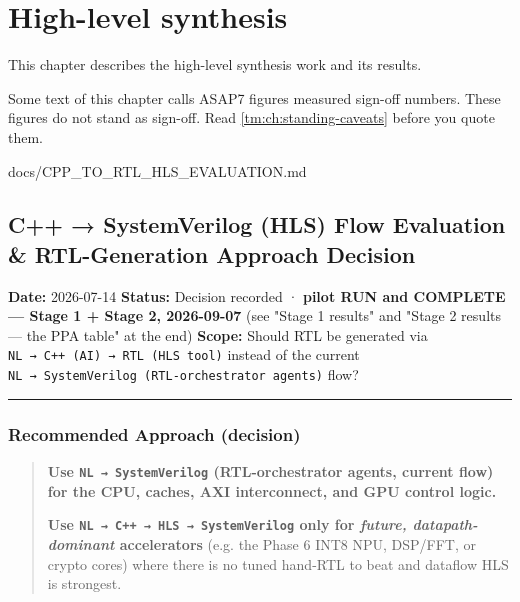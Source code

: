\chapter{High-level synthesis}\label{tm:ch:high-level-synthesis}

This chapter describes the high-level synthesis work and its results.

\begin{information}
Some text of this chapter calls ASAP7 figures measured sign-off numbers. These figures do not stand as sign-off. Read \cref{tm:ch:standing-caveats} before you quote them.
\end{information}

\begin{relocated}{docs/CPP_TO_RTL_HLS_EVALUATION.md}
\section{C++ → SystemVerilog (HLS) Flow Evaluation \& RTL-Generation
Approach Decision}\label{tm:dec:cpp-to-rtl-hls-evaluation}

\textbf{Date:} 2026-07-14 \textbf{Status:} Decision recorded ·
\textbf{pilot RUN and COMPLETE --- Stage 1 + Stage 2, 2026-09-07} (see
"Stage 1 results" and "Stage 2 results --- the PPA table" at the end)
\textbf{Scope:} Should RTL be generated via
\texttt{NL\ →\ C+\allowbreak{}+\allowbreak{}\ (AI)\ →\ RTL\ (HLS\ tool)}
instead of the current
\texttt{NL\ →\ SystemVerilog\ (RTL-\allowbreak{}orchestrator\ agents)}
flow?

\begin{center}\rule{0.5\linewidth}{0.5pt}\end{center}

\subsection{Recommended Approach (decision)}\label{tm:dec:cpp-to-rtl-hls-evaluation:recommended-approach-decision}

\begin{quote}
\textbf{Use \texttt{NL\ →\ SystemVerilog} (RTL-orchestrator agents,
current flow) for the CPU, caches, AXI interconnect, and GPU control
logic.}

\textbf{Use
\texttt{NL\ →\ C+\allowbreak{}+\allowbreak{}\ →\ HLS\ →\ SystemVerilog}
only for \emph{future, datapath-dominant} accelerators} (e.g. the Phase
6 INT8 NPU, DSP/FFT, or crypto cores) where there is no tuned hand-RTL
to beat and dataflow HLS is strongest.
\end{quote}


\end{relocated}
